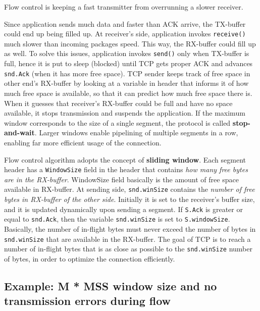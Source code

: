 \documentclass[a4paper, 11pt]{report}
\begin{document}
Flow control is keeping a fast transmitter from overrunning a slower receiver.

Since application sends much data and faster than ACK arrive, the TX-buffer
could end up being filled up. At receiver's side, application invokes
\texttt{receive()} much slower than incoming packages speed. This way, the
RX-buffer could fill up as well. To solve this issues, application invokes
\texttt{send()} only when TX-buffer is full, hence it is put to sleep (blocked)
until TCP gets proper ACK and advances \texttt{snd.Ack} (when it has more free
space). TCP sender keeps track of free space in other end's RX-buffer by
looking at a variable in header that informs it of how much free space is
available, so that it can predict how much free space there is. When it guesses
that receiver's RX-buffer could be full and have no space available, it stops
transmission and suspends the application. If the maximum window corresponds to
the size of a single segment, the protocol is called \textbf{stop-and-wait}.
Larger windows enable pipelining of multiple segments in a row, enabling far
more efficient usage of the connection.

Flow control algorithm adopts the concept of \textbf{sliding window}. Each
segment header has a \texttt{WindowSize} field in the header that contains
\emph{how many free bytes are in the RX-buffer}. WindowSize field basically is
the amount of free space available in RX-buffer. At sending side,
\texttt{snd.winSize} contains the \emph{number of free bytes in RX-buffer of
the other side}. Initially it is set to the receiver's buffer size, and it is
updated dynamically upon sending a segment. If \texttt{S.Ack} is greater or
equal to \texttt{snd.Ack}, then the variable \texttt{snd.winSize} is set to
\texttt{S.windowSize}. Basically, the number of in-flight bytes must never
exceed the number of bytes in \texttt{snd.winSize} that are available in the
RX-buffer. The goal of TCP is to reach a number of in-flight bytes that is as
close as possible to the \texttt{snd.winSize} number of bytes, in order to
optimize the connection efficiently.

\subsection{Example: M * MSS window size and no transmission errors during flow}
\end{document}
